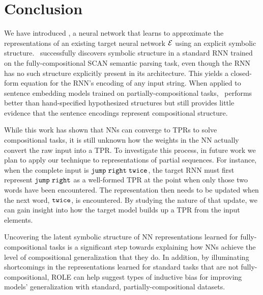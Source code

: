\section{Conclusion} \label{sec:rldn-Conclusion}

We have introduced \RLN, a neural network that learns to approximate the representations of an existing target neural network ${\mathcal{E}}$ using an explicit symbolic structure. \RLN\ successfully discovers symbolic structure in a standard RNN trained on the fully-compositional SCAN semantic parsing task, even though the RNN has no such structure explicitly present in its architecture. This yields a closed-form equation for the RNN's encoding of any input string. 
When applied to sentence embedding models trained on partially-compositional tasks, \RLN\ performs better than hand-specified hypothesized structures but still provides little evidence that the sentence encodings represent compositional structure. 

While this work has shown that NNs can converge to TPRs to solve compositional tasks, it is still unknown how the weights in the NN actually convert the raw input into a TPR. To investigate this process, in future work we plan to apply our technique to representations of partial sequences. For instance, when the complete input is \textcolor{violet}{${\mathtt{jump \hspace{1mm} right \hspace{1mm} twice}}$}, the target RNN must first represent \textcolor{violet}{${\mathtt{jump \hspace{1mm} right}}$} as a well-formed TPR at the point when only those two words have been encountered. The representation then needs to be updated when the next word, \textcolor{violet}{${\mathtt{twice}}$}, is encountered. By studying the nature of that update, we can gain insight into how the target model builds up a TPR from the input elements.



Uncovering the latent symbolic structure of NN representations learned for fully-compositional tasks is a significant step towards explaining how NNs achieve the level of compositional generalization that they do. In addition, by illuminating shortcomings in the representations learned for standard tasks that are not fully-compositional, ROLE can help suggest types of inductive bias for improving models' generalization with standard, partially-compositional datasets.